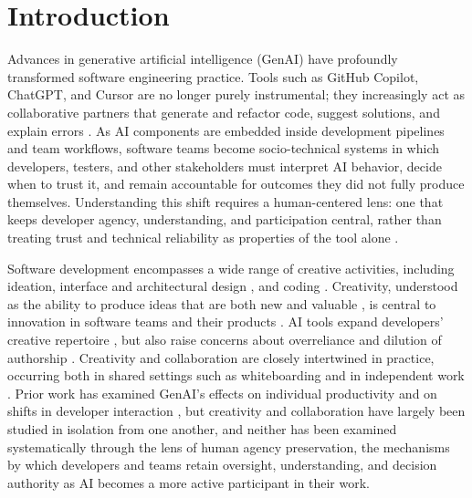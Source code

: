 \documentclass[10pt,journal,compsoc]{IEEEtran}
\begin{document}
\IEEEdisplaynontitleabstractindextext
\IEEEpeerreviewmaketitle

\section{Introduction}

Advances in generative artificial intelligence (GenAI) have profoundly transformed software engineering practice. Tools such as GitHub Copilot, ChatGPT, and Cursor are no longer purely instrumental; they increasingly act as collaborative partners that generate and refactor code, suggest solutions, and explain errors \cite{meem2025,seeber2020}. As AI components are embedded inside development pipelines and team workflows, software teams become socio-technical systems in which developers, testers, and other stakeholders must interpret AI behavior, decide when to trust it, and remain accountable for outcomes they did not fully produce themselves. Understanding this shift requires a human-centered lens: one that keeps developer agency, understanding, and participation central, rather than treating trust and technical reliability as properties of the tool alone \cite{amershi2019}.

Software development encompasses a wide range of creative activities, including ideation, interface and architectural design \cite{groeneveld2021}, and coding \cite{inman2024}. Creativity, understood as the ability to produce ideas that are both new and valuable \cite{boden2004}, is central to innovation in software teams and their products \cite{gama2025}. AI tools expand developers' creative repertoire \cite{jackson2025}, but also raise concerns about overreliance and dilution of authorship \cite{amershi2019}. Creativity and collaboration are closely intertwined in practice, occurring both in shared settings such as whiteboarding \cite{groeneveld2021} and in independent work \cite{inman2024}. Prior work has examined GenAI's effects on individual productivity \cite{jetbrains2025,meem2025,pereira2025} and on shifts in developer interaction \cite{salomon2026}, but creativity and collaboration have largely been studied in isolation from one another, and neither has been examined systematically through the lens of human agency preservation, the mechanisms by which developers and teams retain oversight, understanding, and decision authority as AI becomes a more active participant in their work.
\end{document}
